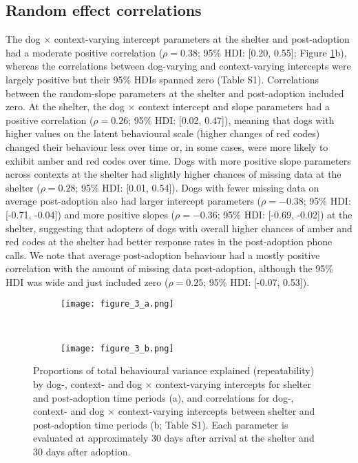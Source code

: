 \documentclass[12pt]{article}
\begin{document}
\subsection{Random effect correlations}
The dog $\times$ context-varying intercept parameters at the shelter and post-adoption had a moderate positive correlation ($\rho = 0.38$; 95\% HDI: [0.20, 0.55]; Figure \ref{fig_corrs_rept}b), whereas the correlations between dog-varying and context-varying intercepts were largely positive but their 95\% HDIs spanned zero (Table S1). Correlations between the random-slope parameters at the shelter and post-adoption included zero. At the shelter, the dog $\times$ context intercept and slope parameters had a positive correlation ($\rho = 0.26$; 95\% HDI: [0.02, 0.47]), meaning that dogs with higher values on the latent behavioural scale (higher changes of red codes) changed their behaviour less over time or, in some cases, were more likely to exhibit amber and red codes over time. Dogs with more positive slope parameters across contexts at the shelter had slightly higher chances of missing data at the shelter ($\rho = 0.28$; 95\% HDI: [0.01, 0.54]). Dogs with fewer missing data on average post-adoption also had larger intercept parameters ($\rho = -0.38$; 95\% HDI: [-0.71, -0.04]) and more positive slopes ($\rho = -0.36$; 95\% HDI: [-0.69, -0.02]) at the shelter, suggesting that adopters of dogs with overall higher chances of amber and red codes at the shelter had better response rates in the post-adoption phone calls. We note that average post-adoption behaviour had a mostly positive correlation with the amount of missing data post-adoption, although the 95\% HDI was wide and just included zero ($\rho = 0.25$; 95\% HDI: [-0.07, 0.53]).

\begin{figure}[t!]
  \centering
  \begin{subfigure}{0.5\textwidth}
    \centering
    \texttt{[image: figure\_3\_a.png]}
  \end{subfigure}%
  ~
  \begin{subfigure}{0.5\textwidth}
    \centering
    \texttt{[image: figure\_3\_b.png]}
  \end{subfigure}
  \caption{Proportions of total behavioural variance explained (repeatability) by dog-, context- and dog $\times$ context-varying intercepts for shelter and post-adoption time periods (a), and correlations for dog-, context- and dog $\times$ context-varying intercepts between shelter and post-adoption time periods (b; Table S1). Each parameter is evaluated at approximately 30 days after arrival at the shelter and 30 days after adoption.}
  \label{fig_corrs_rept}
\end{figure}
\end{document}
